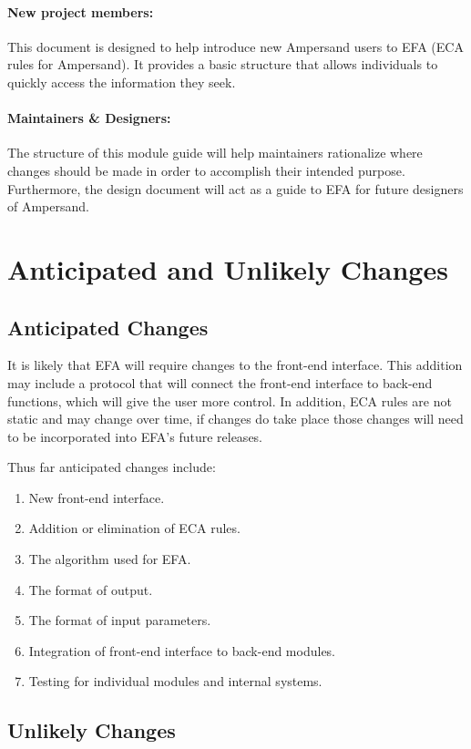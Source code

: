 \documentclass[12pt, svgnames]{article}
\let\Oldsubsection\subsection
\renewcommand{\subsection}{\FloatBarrier\Oldsubsection}
\begin{document}
\paragraph{New project members:}
This document is designed to help introduce new Ampersand users to EFA 
(ECA rules for Ampersand). It provides a basic structure that allows 
individuals to quickly access the information they seek.
   
\paragraph{Maintainers \& Designers:} The structure of this module guide will 
help maintainers rationalize where changes should be made in order to 
accomplish their intended purpose. Furthermore, the design document will act as 
a guide to EFA for future designers of Ampersand.

\section{Anticipated and Unlikely Changes}
\subsection{Anticipated Changes}
It is likely that EFA will require changes to the front-end interface. This 
addition may include a protocol that will connect the front-end interface to 
back-end functions, which will give the user more control. In addition, ECA 
rules are not static and may change over time, if changes do take place those 
changes will need to be incorporated into EFA's future releases. 

Thus far anticipated changes include:

\begin{enumerate}[label=\textbf{AC\arabic*:}]
    \item New front-end interface.
    \item Addition or elimination of ECA rules.
    \item The algorithm used for EFA.
    \item The format of output.
    \item The format of input parameters.
    \item Integration of front-end interface to back-end modules.
    \item Testing for individual modules and internal systems.
\end{enumerate}

\subsection{Unlikely Changes} 
\end{document}
